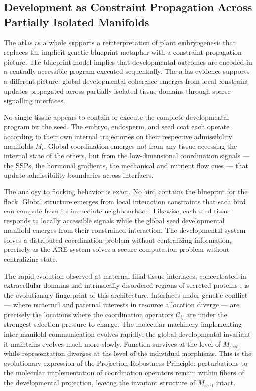 \documentclass[12pt, a4paper]{article}
\theoremstyle{essaystyle}
\begin{document}
\subsection{Development as Constraint Propagation Across Partially Isolated Manifolds}

The atlas as a whole supports a reinterpretation of plant embryogenesis that replaces
the implicit genetic blueprint metaphor with a constraint-propagation picture. The
blueprint model implies that developmental outcomes are encoded in a centrally
accessible program executed sequentially. The atlas evidence supports a different
picture: global developmental coherence emerges from local constraint updates
propagated across partially isolated tissue domains through sparse signalling interfaces.

No single tissue appears to contain or execute the complete developmental program for
the seed. The embryo, endosperm, and seed coat each operate according to their own
internal trajectories on their respective admissibility manifolds $M_i$. Global
coordination emerges not from any tissue accessing the internal state of the others,
but from the low-dimensional coordination signals --- the SSPs, the hormonal gradients,
the mechanical and nutrient flow cues --- that update admissibility boundaries across
interfaces.

The analogy to flocking behavior is exact. No bird contains the blueprint for the
flock. Global structure emerges from local interaction constraints that each bird
can compute from its immediate neighbourhood. Likewise, each seed tissue responds
to locally accessible signals while the global seed developmental manifold emerges
from their constrained interaction. The developmental system solves a distributed
coordination problem without centralizing information, precisely as the ARE system
solves a secure computation problem without centralizing state.

The rapid evolution observed at maternal-filial tissue interfaces, concentrated in
extracellular domains and intrinsically disordered regions of secreted proteins
\citep{martin2026atlas}, is the evolutionary fingerprint of this architecture.
Interfaces under genetic conflict --- where maternal and paternal interests in resource
allocation diverge --- are precisely the locations where the coordination operators
$\mathcal{C}_{ij}$ are under the strongest selection pressure to change. The molecular
machinery implementing inter-manifold communication evolves rapidly; the global
developmental invariant it maintains evolves much more slowly. Function survives at
the level of $M_{\mathrm{seed}}$ while representation diverges at the level of the
individual morphisms. This is the evolutionary expression of the Projection Robustness
Principle: perturbations to the molecular implementation of coordination operators
remain within fibers of the developmental projection, leaving the invariant structure
of $M_{\mathrm{seed}}$ intact.
\end{document}
